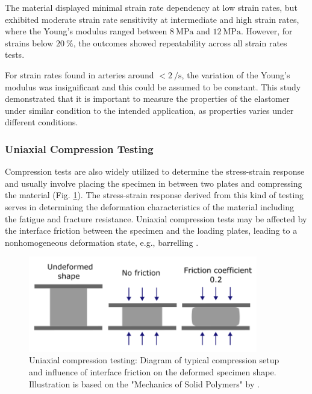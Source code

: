 The material displayed minimal strain rate dependency at low strain rates, but exhibited moderate 
strain rate sensitivity at intermediate and high strain rates, where the Young's modulus ranged between 
$\SI{8}{\mega \pascal}$ and $\SI{12}{\mega \pascal}$. However, for strains below $\SI{20}{\percent}$, the 
outcomes showed repeatability across all strain rates tests. 

For strain rates found in arteries around $<\SI[per-mode = symbol]{2}{\per \second}$, the variation of the
Young's modulus was insignificant and this could be assumed to be constant. This study demonstrated 
that it is important to measure the properties of the elastomer under similar condition to the
intended application, as properties varies under different conditions.

\subsubsection*{Uniaxial Compression Testing}
Compression tests are also widely utilized to determine the stress-strain response and 
usually involve placing the specimen in between two plates and compressing the material (Fig. \ref{fig:compressiondiag}).
The stress-strain response derived from this kind of testing serves in determining the deformation 
characteristics of the material including the fatigue and fracture resistance. 
Uniaxial compression tests may be affected by the interface friction between the specimen and 
the loading plates, leading to a nonhomogeneous deformation state, e.g., barrelling \cite{Bergström2015}.\\

\begin{figure}%
        \centering
       \quad
       \includegraphics[width=10cm]{Images/chapter1/compressiondiag.png}%
       \caption[Uniaxial compression testing setup]{Uniaxial compression testing: Diagram of typical compression setup and influence of interface friction on the deformed specimen shape. Illustration is based on the "Mechanics of Solid Polymers" by \citet{Bergström2015}.}%
       \label{fig:compressiondiag}%
\end{figure}

